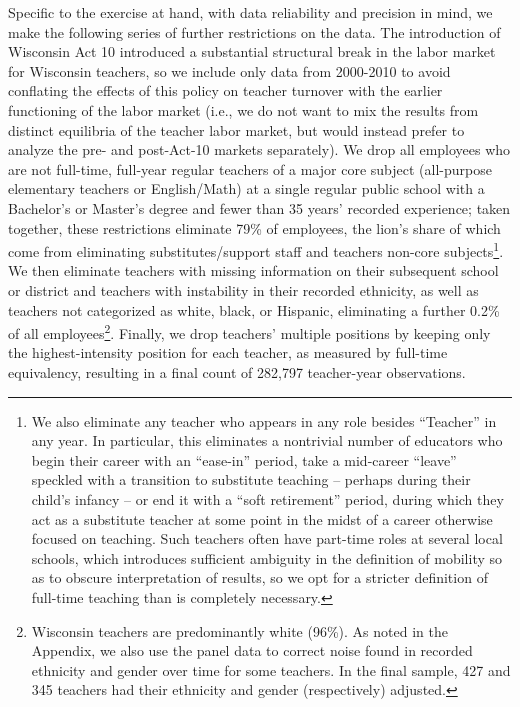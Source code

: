 \documentclass[12pt,]{article}
\let\rmarkdownfootnote\footnote%
\def\footnote{\protect\rmarkdownfootnote}
\begin{document}
Specific to the exercise at hand, with data reliability and precision in
mind, we make the following series of further restrictions on the data.
The introduction of Wisconsin Act 10 introduced a substantial structural
break in the labor market for Wisconsin teachers, so we include only
data from 2000-2010 to avoid conflating the effects of this policy on
teacher turnover with the earlier functioning of the labor market (i.e.,
we do not want to mix the results from distinct equilibria of the
teacher labor market, but would instead prefer to analyze the pre- and
post-Act-10 markets separately). We drop all employees who are not
full-time, full-year regular teachers of a major core subject
(all-purpose elementary teachers or English/Math) at a single regular
public school with a Bachelor's or Master's degree and fewer than 35
years' recorded experience; taken together, these restrictions eliminate
79\% of employees, the lion's share of which come from eliminating
substitutes/support staff and teachers non-core subjects\footnote{\label{ftn:pos_code}We
  also eliminate any teacher who appears in any role besides ``Teacher''
  in any year. In particular, this eliminates a nontrivial number of
  educators who begin their career with an ``ease-in'' period, take a
  mid-career ``leave'' speckled with a transition to substitute teaching
  -- perhaps during their child's infancy -- or end it with a ``soft
  retirement'' period, during which they act as a substitute teacher at
  some point in the midst of a career otherwise focused on teaching.
  Such teachers often have part-time roles at several local schools,
  which introduces sufficient ambiguity in the definition of mobility so
  as to obscure interpretation of results, so we opt for a stricter
  definition of full-time teaching than is completely necessary.}. We
then eliminate teachers with missing information on their subsequent
school or district and teachers with instability in their recorded
ethnicity, as well as teachers not categorized as white, black, or
Hispanic, eliminating a further 0.2\% of all employees\footnote{Wisconsin
  teachers are predominantly white (96\%). As noted in the Appendix, we
  also use the panel data to correct noise found in recorded ethnicity
  and gender over time for some teachers. In the final sample, 427 and
  345 teachers had their ethnicity and gender (respectively) adjusted.}.
Finally, we drop teachers' multiple positions by keeping only the
highest-intensity position for each teacher, as measured by full-time
equivalency, resulting in a final count of 282,797 teacher-year
observations.
\end{document}
